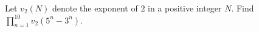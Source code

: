 Let $v_2(N)$ denote the exponent of $2$ in a positive integer $N$. Find $\prod_{n=1}^{10}v_2(5^n-3^n)$.
